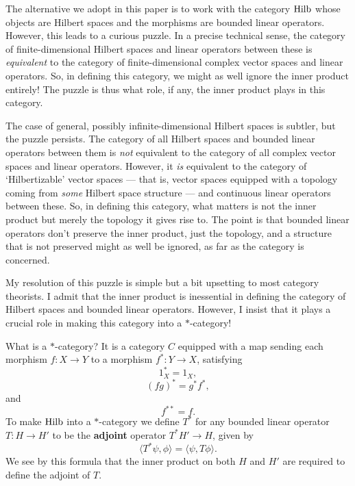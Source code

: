\documentclass{article}
\newcommand{\Hilb}{{\rm Hilb}}
\renewcommand{\to}{\rightarrow}
\newcommand{\maps}{\colon}
\begin{document}
The alternative we adopt in this paper is to work with the category
$\Hilb$ whose objects are Hilbert spaces and the morphisms are bounded
linear operators.  However, this leads to a curious puzzle.  In a 
precise technical sense, the category of finite-dimensional Hilbert 
spaces and linear operators between these is {\it equivalent} to the 
category of finite-dimensional complex vector spaces and linear operators.  
So, in defining this category, we might as well ignore the inner product
entirely!  The puzzle is thus what role, if any, the inner product
plays in this category.

The case of general, possibly infinite-dimensional Hilbert spaces
is subtler, but the puzzle persists.  The category of all Hilbert
spaces and bounded linear operators between them is {\it not}
equivalent to the category of all complex vector spaces and linear
operators.  However, it {\it is} equivalent to the category 
of `Hilbertizable' vector spaces --- that is, vector spaces equipped
with a topology coming from {\it some} Hilbert space structure ---
and continuous linear operators between these.  So, in defining
this category, what matters is not the inner product but merely
the topology it gives rise to.  The point is that bounded linear operators
don't preserve the inner product, just the topology, and a structure
that is not preserved might as well be ignored, as far as the category
is concerned.

My resolution of this puzzle is simple but a bit upsetting to
most category theorists.  I admit that the inner product is inessential
in defining the category of Hilbert spaces and bounded linear
operators.  However, I insist that it plays a crucial role in making 
this category into a $\ast$-category!

What is a $\ast$-category?  It is a category $C$
equipped with a map sending each morphism $f \maps X \to Y$ to
a morphism $f^\ast \maps Y \to X$, satisfying
\[             1_X^\ast = 1_X ,\]
\[            (fg)^\ast = g^\ast f^\ast, \]
and 
\[          f^{\ast\ast} = f. \]
To make $\Hilb$ into a $\ast$-category we
define $T^\ast$ for any bounded linear operator $T \maps H \to H'$
to be the {\bf adjoint} operator $T^\ast H' \to H$, given
by 
\[   \langle T^\ast \psi,\phi \rangle = \langle \psi, T\phi \rangle .\]
We see by this formula that the inner product on both $H$ and $H'$
are required to define the adjoint of $T$.
\end{document}

